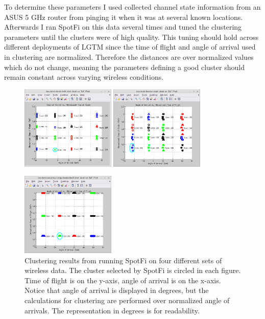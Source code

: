 \documentclass[12pt]{report}
\begin{document}
To determine these parameters I used collected channel state information from an ASUS 5 GHz router from pinging it when it was at several known locations. Afterwards I ran SpotFi on this data several times and tuned the clustering parameters until the clusters were of high quality. This tuning should hold across different deployments of LGTM since the time of flight and angle of arrival used in clustering are normalized. Therefore the distances are over normalized values which do not change, meaning the parameters defining a good cluster should remain constant across varying wireless conditions. \par

\begin{figure}[!htb]
    \begin{center}
        \caption{Clustering results from running SpotFi on four different sets of wireless data. The cluster selected by SpotFi is circled in each figure. Time of flight is on the y-axis, angle of arrival is on the x-axis. Notice that angle of arrival is displayed in degrees, but the calculations for clustering are performed over normalized angle of arrivals. The representation in degrees is for readability.}
        \label{figure: spotfi-clustering}
        \includegraphics[width=0.4\textwidth]{../images/clustering-desk-left.png}
        \includegraphics[width=0.4\textwidth]{../images/clustering-heater.png}
        \par\smallskip
        \includegraphics[width=0.4\textwidth]{../images/clustering-long-bookshelf.png}

\end{center}
\end{figure}
\end{document}
